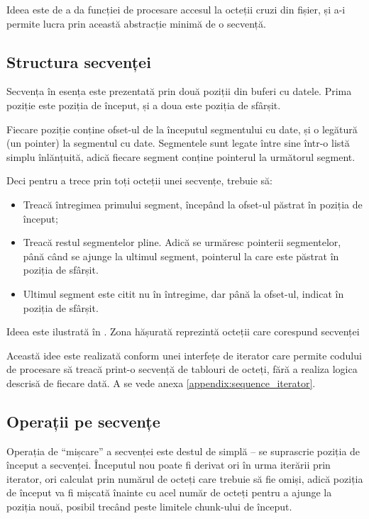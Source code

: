 \documentclass[a4paper,12pt]{report}
\begin{document}
Ideea este de a da funcției de procesare accesul la octeții cruzi din fișier,
și a-i permite lucra prin această abstracție minimă de o secvență.

\subsection{Structura secvenței}

Secvența în esența este prezentată prin două poziții din buferi cu datele.
Prima poziție este poziția de început, și a doua este poziția de sfârșit.

Fiecare poziție conține ofset-ul de la începutul segmentului cu date,
și o legătură (un pointer) la segmentul cu date.
Segmentele sunt legate între sine într-o listă simplu înlănțuită, adică
fiecare segment conține pointerul la următorul segment.

Deci pentru a trece prin toți octeții unei secvențe, trebuie să:
\begin{itemize}
    \item
        Treacă întregimea primului segment, începând la ofset-ul păstrat în poziția de început;
    \item
        Treacă restul segmentelor pline.
        Adică se urmăresc pointerii segmentelor, până când se ajunge la ultimul segment,
        pointerul la care este păstrat în poziția de sfârșit.
    \item
        Ultimul segment este citit nu în întregime, dar până la ofset-ul,
        indicat în poziția de sfârșit.
\end{itemize}

Ideea este ilustrată în .
Zona hășurată reprezintă octeții care corespund secvenței


Această idee este realizată conform unei interfețe de iterator care permite codului de procesare
să treacă print-o secvență de tablouri de octeți, fără a realiza logica descrisă de fiecare dată.
A se vede anexa \ref{appendix:sequence_iterator}.

\subsection{Operații pe secvențe}

Operația de ``mișcare'' a secvenței este destul de simplă -- se suprascrie poziția de început a secvenței.
Începutul nou poate fi derivat ori în urma iterării prin iterator,
ori calculat prin numărul de octeți care trebuie să fie omiși,
adică poziția de început va fi mișcată înainte cu acel număr de octeți
pentru a ajunge la poziția nouă, posibil trecând peste limitele chunk-ului de început.
\end{document}
